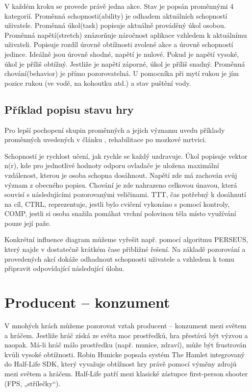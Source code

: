 V každém kroku se provede právě jedna akce. Stav je popsán proměnnými 4 kategorií. Proměnná schopnosti(ability) je odhadem aktuálních schopností uživatele. Proměnná úkol(task) popisuje aktuálně prováděný úkol osobou. Proměnná napětí(stretch) znázorňuje náročnost aplikace vzhledem k aktuálnímu uživateli. Popisuje rozdíl úrovně obtížnosti zvolené akce a úrovně schopností jedince. Ideálně jsou úrovně shodné, napětí je nulové. Pokud je napětí vysoké, úkol je příliš obtížný. Jestliže je napětí záporné, úkol je příliš snadný. Proměnná chování(behavior) je přímo pozorovatelná. U pomocníka při mytí rukou je jím pozice rukou (ve vodě, na kohoutku atd.) a stav puštění vody.

\subsection{Příklad popisu stavu hry}

Pro lepší pochopení skupin proměnných a jejich významu uvedu příklady proměnných uvedených v článku \cite{9Pomdp}, rehabilitace po mozkové mrtvici.

Schopností je rychlost učení, jak rychle se každý uzdravuje. Úkol popisuje vektor n(r), kde pro jednotlivé hodnoty odporu ovladače je uložena maximální vzdálenost, kterou je osoba schopna dosáhnout. Napětí zde má zachován svůj význam z obecného popisu. Chování je zde nahrazeno celkovou únavou, která souvisí s následujícími pozorovanými veličinami. TTT, čas potřebný k dosáhnutí na cíl, CTRL, reprezentuje, jestli bylo cvičení vykonáno s pomocí kontroly, COMP, jestli si osoba snažila pomáhat vrchní polovinou těla místo využívání pouze její paže.

Konkrétní influence diagram můžeme vyřešit např. pomocí algoritmu PERSEUS, který najde v dostatečně krátkém čase přibližné řešení. Na základě pozorování a provedených akcí dokáže odhadnout schopnosti uživatele a vzhledem k tomu připravit odpovídající následující úlohu.

\section{Producent – konzument}

V mnohých hrách můžeme pozorovat vztah producent – konzument mezi světem a hráčem. Jestliže hráč získá ze světa moc prostředků, hra přestává být výzvou a naopak. Má-li hráč málo prostředku (např. munice, zdraví), může být frustrován kvůli vysoké obtížnosti.
Robin Hunicke popsala systém The Hamlet integrovaný do Half-Life SDK\cite{20Hun}, který vyvažuje obtížnost hry právě pomocí výměny zdrojů mezi světem a hráčem. Half-Life patří mezi klasické zástupce first-person shooter (FPS, „střílečky“).


